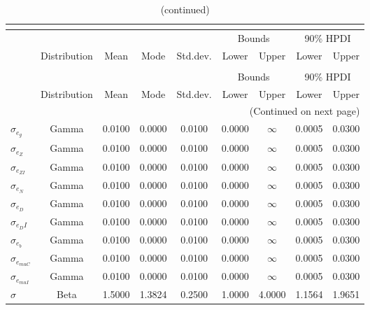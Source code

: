  
\begin{center}
\begin{longtable}{lcccccccc} 
\caption{Prior information (parameters)}\\
 \label{Table:Prior}\\
\toprule%
  &  &  &  &  & \multicolumn{2}{c}{Bounds} & \multicolumn{2}{c}{90\% HPDI} \\ 
  \cmidrule(r{.75em}){6-7} \cmidrule(r{.75em}){8-9}
  & Distribution & Mean & Mode & Std.dev. & Lower & Upper & Lower & Upper  \\ 
\midrule
\endfirsthead
\caption{(continued)}\\
 \toprule%
  &  &  &  &  & \multicolumn{2}{c}{Bounds} & \multicolumn{2}{c}{90\% HPDI} \\ 
  \cmidrule(r{.75em}){6-7} \cmidrule(r{.75em}){8-9}
  & Distribution & Mean & Mode & Std.dev. & Lower & Upper & Lower & Upper  \\ 
\midrule
\endhead
\midrule
\multicolumn{9}{r}{(Continued on next page)} \\ 
\bottomrule
\endfoot
\bottomrule
\endlastfoot
$ \sigma_{{e_g}} $ & Gamma & 0.0100 & 0.0000 & 0.0100 & 0.0000 & $\infty$ & 0.0005 & 0.0300 \\ 
$ \sigma_{{e_Z}} $ & Gamma & 0.0100 & 0.0000 & 0.0100 & 0.0000 & $\infty$ & 0.0005 & 0.0300 \\ 
$ \sigma_{{e_{ZI}}} $ & Gamma & 0.0100 & 0.0000 & 0.0100 & 0.0000 & $\infty$ & 0.0005 & 0.0300 \\ 
$ \sigma_{{e_N}} $ & Gamma & 0.0100 & 0.0000 & 0.0100 & 0.0000 & $\infty$ & 0.0005 & 0.0300 \\ 
$ \sigma_{{e_D}} $ & Gamma & 0.0100 & 0.0000 & 0.0100 & 0.0000 & $\infty$ & 0.0005 & 0.0300 \\ 
$ \sigma_{{e_DI}} $ & Gamma & 0.0100 & 0.0000 & 0.0100 & 0.0000 & $\infty$ & 0.0005 & 0.0300 \\ 
$ \sigma_{{e_b}} $ & Gamma & 0.0100 & 0.0000 & 0.0100 & 0.0000 & $\infty$ & 0.0005 & 0.0300 \\ 
$ \sigma_{{e_{muC}}} $ & Gamma & 0.0100 & 0.0000 & 0.0100 & 0.0000 & $\infty$ & 0.0005 & 0.0300 \\ 
$ \sigma_{{e_{muI}}} $ & Gamma & 0.0100 & 0.0000 & 0.0100 & 0.0000 & $\infty$ & 0.0005 & 0.0300 \\ 
$ {\sigma} $ & Beta & 1.5000 & 1.3824 & 0.2500 & 1.0000 & 4.0000 & 1.1564 & 1.9651 \\ 

\end{longtable}
\end{center}

